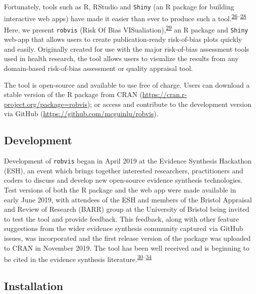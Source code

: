 \documentclass[a4paper, nobind]{templates/ociamthesis}
\begin{document}
Fortunately, tools such as R, RStudio and \texttt{Shiny} (an R package for building interactive web apps) have made it easier than ever to produce such a tool.\textsuperscript{\protect\hyperlink{ref-rref}{26}--\protect\hyperlink{ref-shinyref}{28}} Here, we present \texttt{robvis} (Risk Of Bias VISualiation),\textsuperscript{\protect\hyperlink{ref-mcguinness2019a}{29}} an R package and \texttt{Shiny} web-app that allows users to create publication-ready risk-of-bias plots quickly and easily. Originally created for use with the major risk-of-bias assessment tools used in health research, the tool allows users to visualize the results from any domain-based risk-of-bias assessment or quality appraisal tool.

The tool is open-source and available to use free of charge. Users can download a stable version of the R package from CRAN (\url{https://cran.r-project.org/package=robvis}); or access and contribute to the development version via GitHub (\url{https://github.com/mcguinlu/robvis}).

\hypertarget{development}{%
\subsection{Development}\label{development}}

Development of \texttt{robvis} began in April 2019 at the Evidence Synthesis Hackathon (ESH), an event which brings together interested researchers, practitioners and coders to discuss and develop new open-source evidence synthesis technologies. Test versions of both the R package and the web app were made available in early June 2019, with attendees of the ESH and members of the Bristol Appraisal and Review of Research (BARR) group at the University of Bristol being invited to test the tool and provide feedback. This feedback, along with other feature suggestions from the wider evidence synthesis community captured via GitHub issues, was incorporated and the first release version of the package was uploaded to CRAN in November 2019. The tool has been well received and is beginning to be cited in the evidence synthesis literature.\textsuperscript{\protect\hyperlink{ref-gibb2019consistent}{30}--\protect\hyperlink{ref-tanneru2020}{34}}

\hypertarget{installation}{%
\subsection{Installation}\label{installation}}
\end{document}
